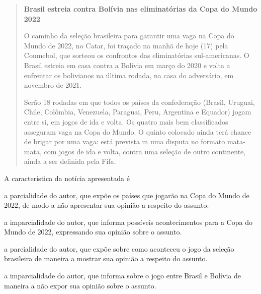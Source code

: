 \begin{quote}
\textbf{Brasil estreia contra Bolívia nas eliminatórias da Copa do Mundo
2022}


O caminho da seleção brasileira para garantir uma vaga na Copa do Mundo
de 2022, no Catar, foi traçado na manhã de hoje (17) pela Conmebol, que
sorteou os confrontos das eliminatórias sul-americanas. O Brasil estreia
em casa contra a Bolívia em março do 2020 e volta a enfrentar os
bolivianos na última rodada, na casa do adversário, em novembro de 2021.

Serão 18 rodadas em que todos os países da confederação (Brasil,
Uruguai, Chile, Colômbia, Venezuela, Paraguai, Peru, Argentina e
Equador) jogam entre si, em jogos de ida e volta. Os quatro mais bem
classificados asseguram vaga na Copa do Mundo. O quinto colocado ainda
terá chance de brigar por uma vaga: está prevista m uma disputa no
formato mata-mata, com jogos de ida e volta, contra uma seleção de outro
continente, ainda a ser definida pela Fifa.

\end{quote}

A característica da notícia apresentada é

\begin{escolha}
\item a parcialidade do autor, que expõe os países que jogarão na Copa do
Mundo de 2022, de modo a não apresentar sua opinião a respeito do
assunto.

\item a imparcialidade do autor, que informa possíveis acontecimentos para
a Copa do Mundo de 2022, expressando sua opinião sobre o assunto.

\item a parcialidade do autor, que expõe sobre como aconteceu o jogo da
seleção brasileira de maneira a mostrar sua opinião a respeito do
assunto.

\item a imparcialidade do autor, que informa sobre o jogo entre Brasil e
Bolívia de maneira a não expor sua opinião sobre o assunto.
\end{escolha}

